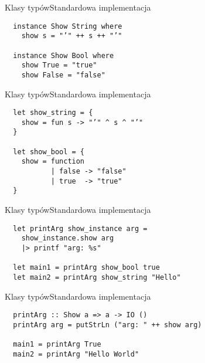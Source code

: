 \documentclass{beamer}
\begin{document}
\begin{frame}[fragile]{Klasy typów}{Standardowa implementacja}
\begin{center}
\begin{minipage}{1.0\textwidth}
\begin{verbatim}
  instance Show String where
    show s = "’" ++ s ++ "’"
 
  instance Show Bool where
    show True = "true"
    show False = "false"
\end{verbatim}
\end{minipage}
\end{center}
\end{frame}

\begin{frame}[fragile]{Klasy typów}{Standardowa implementacja}
\begin{center}
\begin{minipage}{1.0\textwidth}
\begin{verbatim}
  let show_string = {
    show = fun s -> "’" ^ s ^ "’"
  }

  let show_bool = {
    show = function
           | false -> "false"
           | true  -> "true"
  }
\end{verbatim}
\end{minipage}
\end{center}
\end{frame}

\begin{frame}[fragile]{Klasy typów}{Standardowa implementacja}
\begin{center}
\begin{minipage}{1.0\textwidth}
\begin{verbatim}
  let printArg show_instance arg =
    show_instance.show arg
    |> printf "arg: %s"
  
  let main1 = printArg show_bool true
  let main2 = printArg show_string "Hello"
\end{verbatim}
\end{minipage}
\end{center}
\end{frame}

\begin{frame}[fragile]{Klasy typów}{Standardowa implementacja}
\begin{center}
\begin{minipage}{1.0\textwidth}
\begin{verbatim}
  printArg :: Show a => a -> IO ()
  printArg arg = putStrLn ("arg: " ++ show arg)
  
  main1 = printArg True
  main2 = printArg "Hello World"
\end{verbatim}
\end{minipage}
\end{center}
\end{frame}
\end{document}

